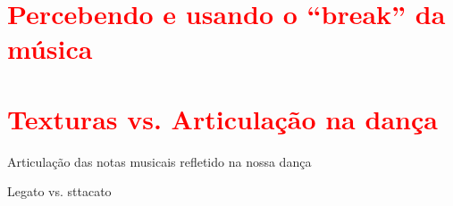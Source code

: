 \section{\textcolor{red}{Percebendo e usando o ``break'' da música}}


\section{\textcolor{red}{Texturas vs. Articulação na dança }}
Articulação das notas musicais refletido na nossa dança

Legato vs. sttacato



